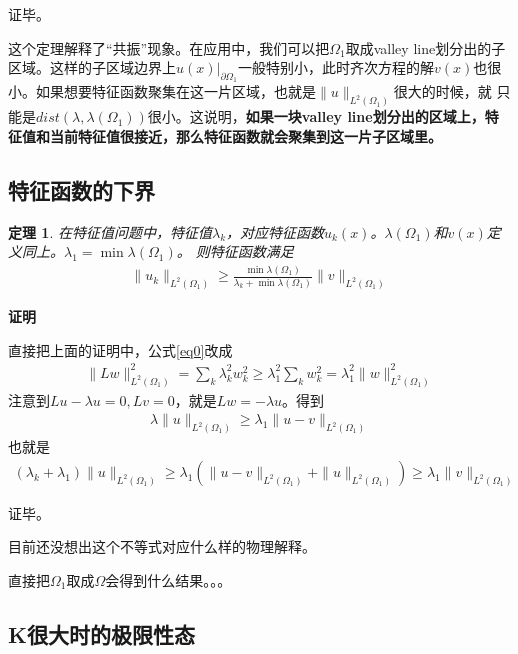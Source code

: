 \documentclass[12pt,a4paper]{article}
\newtheorem{theorem}{定理}
\begin{document}
证毕。

这个定理解释了“共振”现象。在应用中，我们可以把$\Omega_1$取成valley line划分出的子区域。这样的子区域边界上$u(x)|_{\partial \Omega_1}$一般特别小，此时齐次方程的解$v(x)$也很小。如果想要特征函数聚集在这一片区域，也就是$\|u\|_{L^2(\Omega_1)}$很大的时候，就 只能是$dist(\lambda, \lambda(\Omega_1))$很小。这说明，\textbf{如果一块valley line划分出的区域上，特征值和当前特征值很接近，那么特征函数就会聚集到这一片子区域里。}

\subsection{特征函数的下界}

\begin{theorem}

在特征值问题中，特征值$\lambda_k$，对应特征函数$u_k(x)$。$\lambda(\Omega_1)$和$v(x)$定义同上。$\lambda_1 = \min \lambda(\Omega_1)$。
则特征函数满足
\begin{align}
\|u_k\|_{L^2(\Omega_1)} \geq \frac{\min \lambda(\Omega_1)}{\lambda_k + \min \lambda(\Omega_1)} \|v\|_{L^2(\Omega_1)}
\end{align}

\end{theorem}

\textbf{证明}

直接把上面的证明中，公式\ref{eq0}改成
\begin{align}
\|L w\|_{L^2(\Omega_1)}^2 = \sum_k \lambda_k^2 w_k^2 \geq \lambda_1^2 \sum_k w_k^2 = \lambda_1^2 \|w\|_{L^2(\Omega_1)}^2
\end{align}
注意到$L u - \lambda u = 0, L v = 0$，就是$L w = - \lambda u$。得到
\begin{align}
\lambda \|u\|_{L^2(\Omega_1)} \geq \lambda_1 \|u - v\|_{L^2(\Omega_1)}
\end{align}
也就是
\begin{align}
(\lambda_k + \lambda_1) \|u\|_{L^2(\Omega_1)} \geq \lambda_1 (\|u - v\|_{L^2(\Omega_1)} + \|u\|_{L^2(\Omega_1)}) \geq \lambda_1 \|v\|_{L^2(\Omega_1)}
\end{align}

证毕。

目前还没想出这个不等式对应什么样的物理解释。

{\color{gray} 直接把$\Omega_1$取成$\Omega$会得到什么结果。。。}

\subsection{K很大时的极限性态}
\end{document}
